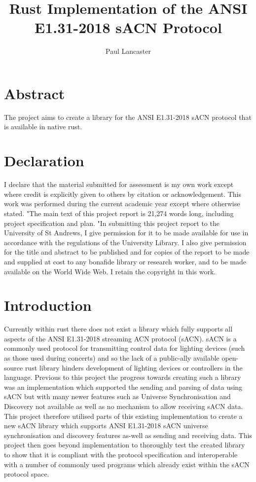 \documentclass[11pt,a4paper]{article}
\author{Paul Lancaster}
\title{Rust Implementation of the ANSI E1.31-2018 sACN Protocol}
\begin{document}


\section{Abstract}
The project aims to create a library for the ANSI E1.31-2018 sACN protocol \cite{ANSI_E1.31} that is available in native rust.

\section{Declaration}
I declare that the material submitted for
assessment is my own work except where credit is
explicitly given to others by citation or
acknowledgement. This work was performed during
the current academic year except where otherwise
stated.
"The main text of this project report is 21,274
words long, including project specification and plan.
"In submitting this project report to the University of
St Andrews, I give permission for it to be made
available for use in accordance with the regulations of the University Library. I also give permission for
the title and abstract to be published and for copies of the report to be made and supplied at cost to any bonafide library or research worker, and to be made
available on the World Wide Web. I retain the
copyright in this work.

\pagebreak
\tableofcontents
\pagebreak

\section{Introduction}
Currently within rust there does not exist a library which fully supports all aspects of the ANSI E1.31-2018 streaming ACN protocol \cite{ANSI_E1.31} (sACN). sACN is a commonly used protocol for transmitting control data for lighting devices (such as those used during concerts) and so the lack of a public-ally available open-source rust library hinders development of lighting devices or controllers in the language. Previous to this project the progress towards creating such a library was an implementation \cite{ORIGINAL_IMPL} which supported the sending and parsing of data using sACN but with many newer features such as Universe Synchronisation and Discovery not available as well as no mechanism to allow receiving sACN data. This project therefore utilised parts of this existing implementation to create a new sACN library which supports ANSI E1.31-2018 sACN universe synchronisation and discovery features as-well as sending and receiving data. This project then goes beyond implementation to thoroughly test the created library to show that it is compliant with the protocol specification and interoperable with a number of commonly used programs which already exist within the sACN protocol space. \\
\end{document}
